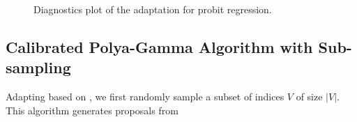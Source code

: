 \documentclass[12pt]{article}
\begin{document}
\begin{figure}[H]
  {\caption { Diagnostics plot of the adaptation for probit regression. \label{probitAdaptDiag}}}
  {%
    \qquad
  }
\end{figure}
{
\subsection{Calibrated  Polya-Gamma Algorithm with Sub-sampling}
}
Adapting based on \cite{johndrow2015approximations}, we first randomly sample
a subset of indices $V$ of size $|V|$. This algorithm  generates proposals from
\end{document}
